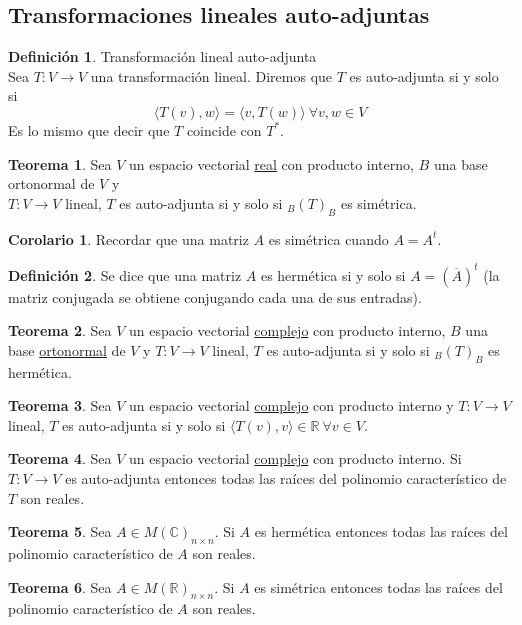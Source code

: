 \documentclass[10pt]{article}
\theoremstyle{definition}
\newtheorem{definition}{Definición}[section]
\newtheorem{theorem}{Teorema}[section]
\newtheorem{corollary}{Corolario}[theorem]
\begin{document}
\subsection{Transformaciones lineales auto-adjuntas}
\begin{definition}{Transformación lineal auto-adjunta}
	\\Sea $T:V\to V$ una transformación lineal. Diremos que $T$ es auto-adjunta si y solo si $$\langle T(v),w\rangle=\langle v,T(w)\rangle\ \forall v,w\in V$$
	Es lo mismo que decir que $T$ coincide con $T^*$.
\end{definition}
\begin{theorem}
	Sea $V$ un espacio vectorial \underline{real} con producto interno, $B$ una base ortonormal de $V$ y\\ $T:V\to V$ lineal, $T$ es auto-adjunta si y solo si $_B(T)_B$ es simétrica.
\end{theorem}
\begin{corollary}
	Recordar que una matriz $A$ es simétrica cuando $A=A^t$.
\end{corollary}
\begin{definition}
	Se dice que una matriz $A$ es hermética si y solo si $A=(\overline{A})^t$ (la matriz conjugada se obtiene conjugando cada una de sus entradas).
\end{definition}
\begin{theorem}
	Sea $V$ un espacio vectorial \underline{complejo} con producto interno, $B$ una base \underline{ortonormal} de $V$ y $T:V\to V$ lineal, $T$ es auto-adjunta si y solo si $_B(T)_B$ es hermética.
\end{theorem}
\begin{theorem}
	Sea $V$ un espacio vectorial \underline{complejo} con producto interno y $T:V\to V$ lineal, $T$ es auto-adjunta si y solo si $\langle T(v),v\rangle\in\mathbb{R}\ \forall v\in V$.
\end{theorem}
\begin{theorem}
	Sea $V$ un espacio vectorial \underline{complejo} con producto interno. Si $T:V\to V$ es auto-adjunta entonces todas las raíces del polinomio característico de $T$ son reales.
\end{theorem}
\begin{theorem}
	Sea $A\in M(\mathbb{C})_{n\times n}$. Si $A$ es hermética entonces todas las raíces del polinomio característico de $A$ son reales.
\end{theorem}
\begin{theorem}
	Sea $A\in M(\mathbb{R})_{n\times n}$. Si $A$ es simétrica entonces todas las raíces del polinomio característico de $A$ son reales.
\end{theorem}
\end{document}
